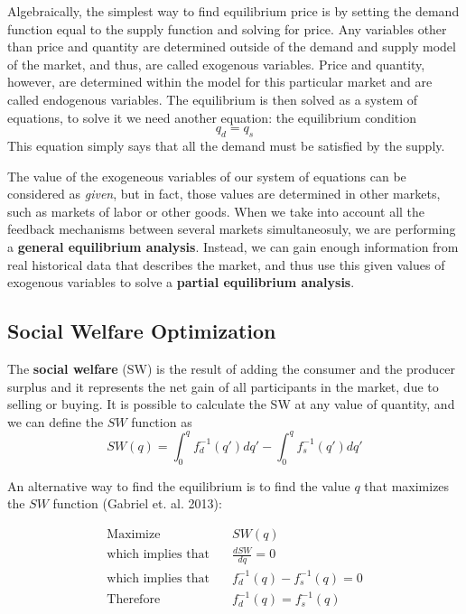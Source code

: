 \documentclass[11pt, letterpaper]{article}
\begin{document}
Algebraically, the simplest way to find equilibrium price is by setting the demand function equal to the supply function and solving for price.
Any variables other than price and quantity are determined outside of the demand and supply model of the market, and thus, are called exogenous variables. Price and quantity, however, are determined within the model for this particular market and are called endogenous variables. The equilibrium is then solved as a system of equations, to solve it we need another equation: the equilibrium condition
\begin{equation}
    q_d=q_s
\end{equation}
This equation simply says that all the demand must be satisfied by the supply.
\smallskip
 
The value of the exogeneous variables of our system of equations can be considered as \textit{given}, but in fact, those values are determined in other markets, such as markets of labor or other goods. When we take into account all the feedback mechanisms between several markets simultaneosuly, we are performing a \textbf{general equilibrium analysis}. Instead, we can gain enough information from real historical data that describes the market, and thus use this given values of exogenous variables to solve a \textbf{partial equilibrium analysis}.

\subsection{Social Welfare Optimization}

The \textbf{social welfare}  (SW) is the result of adding the consumer and the producer surplus and it represents the net gain of all participants in the market, due to selling or buying. It is possible to calculate the SW at any value of quantity, and we can define the $SW$ function as
\begin{equation}
    SW(q)=\int_0^q f^{-1}_d(q')dq' - \int_0^q f^{-1}_s(q')dq'
\end{equation}

An alternative way to find the equilibrium is to find the value $q$ that maximizes the $SW$ function (Gabriel et. al. 2013):

\begin{align}
    \textrm{Maximize} & \quad SW(q)\\
    \textrm{which implies that} & \quad \frac{dSW}{dq}=0\\
    \textrm{which implies that} & \quad f^{-1}_d(q)- f^{-1}_s(q)=0\\
    \textrm{Therefore} & \quad f^{-1}_d(q) = f^{-1}_s(q)
\end{align}
\end{document}
